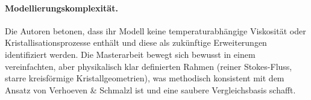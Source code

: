 \documentclass[a4paper,12pt]{article}
\begin{document}
\paragraph{Modellierungskomplexit\"at.}
Die Autoren betonen, dass ihr Modell keine temperaturabh\"angige Viskosit\"at
oder Kristallisationsprozesse enth\"alt und diese als zuk\"unftige Erweiterungen
identifiziert werden. Die Masterarbeit bewegt sich bewusst in einem
vereinfachten, aber physikalisch klar definierten Rahmen (reiner Stokes-Fluss,
starre kreisf\"ormige Kristallgeometrien), was methodisch konsistent mit dem
Ansatz von Verhoeven \& Schmalzl ist und eine saubere Vergleichsbasis
schafft.
\end{document}
